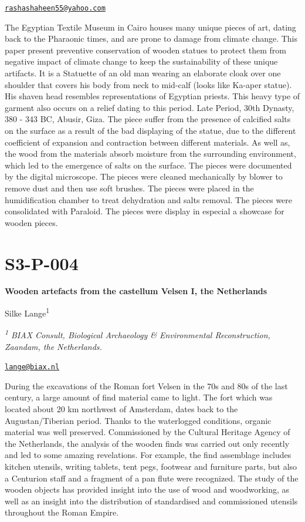 \documentclass[
]{book}
\begin{document}
\href{mailto:rashashaheen55@yahoo.com}{\nolinkurl{rashashaheen55@yahoo.com}}

The Egyptian Textile Museum in Cairo houses many unique pieces of art, dating back to the Pharaonic times, and are prone to damage from climate change. This paper present preventive conservation of wooden statues to protect them from negative impact of climate change to keep the sustainability of these unique artifacts. It is a Statuette of an old man wearing an elaborate cloak over one shoulder that covers his body from neck to mid-calf (looks like Ka-aper statue). His shaven head resembles representations of Egyptian priests. This heavy type of garment also occurs on a relief dating to this period. Late Period, 30th Dynasty, 380 - 343 BC, Abusir, Giza. The piece suffer from the presence of calcified salts on the surface as a result of the bad displaying of the statue, due to the different coefficient of expansion and contraction between different materials. As well as, the wood from the materials absorb moisture from the surrounding environment, which led to the emergence of salts on the surface. The pieces were documented by the digital microscope. The pieces were cleaned mechanically by blower to remove dust and then use soft brushes. The pieces were placed in the humidification chamber to treat dehydration and salts removal. The pieces were consolidated with Paraloid. The pieces were display in especial a showcase for wooden pieces.

\hypertarget{s3-p-004}{%
\section*{S3-P-004}\label{s3-p-004}}

\textbf{Wooden artefacts from the castellum Velsen I, the Netherlands}

Silke Lange\textsuperscript{1}

\emph{\textsuperscript{1} BIAX Consult, Biological Archaeology \& Environmental Reconstruction, Zaandam, the Netherlands.}

\href{mailto:lange@biax.nl}{\nolinkurl{lange@biax.nl}}

During the excavations of the Roman fort Velsen in the 70s and 80s of the last century, a large amount of find material came to light. The fort which was located about 20 km northwest of Amsterdam, dates back to the Augustan/Tiberian period. Thanks to the waterlogged conditions, organic material was well preserved. Commissioned by the Cultural Heritage Agency of the Netherlands, the analysis of the wooden finds was carried out only recently and led to some amazing revelations. For example, the find assemblage includes kitchen utensils, writing tablets, tent pegs, footwear and furniture parts, but also a Centurion staff and a fragment of a pan flute were recognized. The study of the wooden objects has provided insight into the use of wood and woodworking, as well as an insight into the distribution of standardised and commissioned utensils throughout the Roman Empire.
\end{document}
